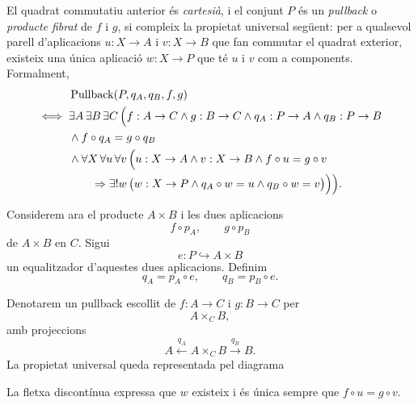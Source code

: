 \begin{definicio}\label{def:pullback}
El quadrat commutatiu anterior és \emph{cartesià}, i el conjunt \(P\) és un \emph{pullback} o \emph{producte fibrat} de \(f\) i \(g\), si compleix la propietat universal següent: per a qualsevol parell d'aplicacions \(u:X\to A\) i \(v:X\to B\) que fan commutar el quadrat exterior, existeix una única aplicació \(w:X\to P\) que té \(u\) i \(v\) com a components. Formalment,
\[
\begin{aligned}
&\operatorname{Pullback}(P,q_A,q_B,f,g)
\\
\iff {}&
\exists A\,\exists B\,\exists C\,\Bigl(
 f:A\to C\land g:B\to C
\land q_A:P\to A\land q_B:P\to B
\\
&{}\land f\circ q_A=g\circ q_B
\\
&{}\land\forall X\,\forall u\,\forall v\,
\Bigl(
 u:X\to A\land v:X\to B\land f\circ u=g\circ v
\\
&\qquad{}\Rightarrow
\exists!w\,\bigl(
 w:X\to P\land q_A\circ w=u\land q_B\circ w=v
\bigr)
\Bigr)
\Bigr).
\end{aligned}
\]
\end{definicio}

Considerem ara el producte \(A\times B\) i les dues aplicacions
\[
f\circ p_A,
\qquad
g\circ p_B
\]
de \(A\times B\) en \(C\). Sigui
\[
e:P\hookrightarrow A\times B
\]
un equalitzador d'aquestes dues aplicacions. Definim
\[
q_A=p_A\circ e,
\qquad
q_B=p_B\circ e.
\]

\begin{notacio}\label{not:pullback}
Denotarem un pullback escollit de \(f:A\to C\) i \(g:B\to C\) per
\[
A\times_C B,
\]
amb projeccions
\[
A\xleftarrow{q_A}A\times_C B\xrightarrow{q_B}B.
\]
La propietat universal queda representada pel diagrama
\begin{center}
\end{center}
La fletxa discontínua expressa que \(w\) existeix i és única sempre que \(f\circ u=g\circ v\).
\end{notacio}

